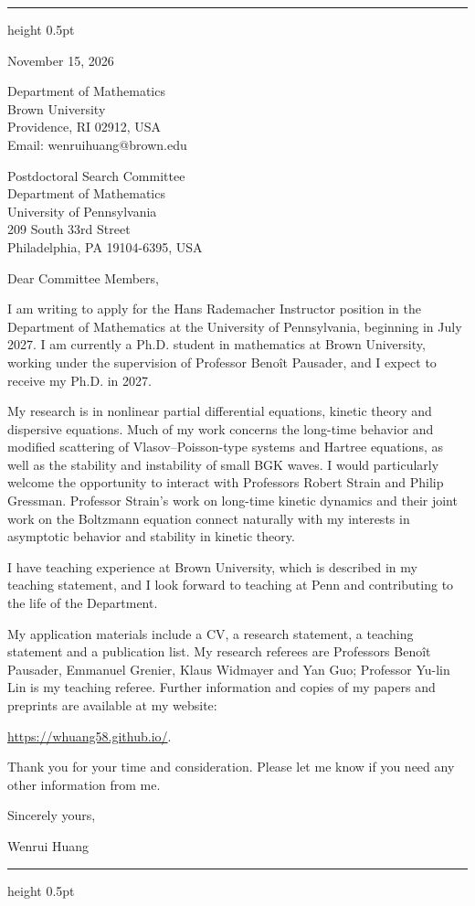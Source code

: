 \documentclass[10pt]{article}
\begin{document}
\vspace{0.08in}
\hrule height 0.5pt

\vspace{0.47in}
\hfill
\begin{minipage}{2.27in}
November 15, 2026

\vspace{0.16in}
Department of Mathematics\\
Brown University\\
Providence, RI 02912, USA\\
Email: wenrui\textunderscore huang@brown.edu
\end{minipage}

\vspace{0.30in}
Postdoctoral Search Committee\\
Department of Mathematics\\
University of Pennsylvania\\
209 South 33rd Street\\
Philadelphia, PA 19104-6395, USA

\vspace{0.16in}
Dear Committee Members,

I am writing to apply for the Hans Rademacher Instructor position in the Department of Mathematics at the University of Pennsylvania, beginning in July 2027. I am currently a Ph.D. student in mathematics at Brown University, working under the supervision of Professor Beno\^{i}t Pausader, and I expect to receive my Ph.D. in 2027.

My research is in nonlinear partial differential equations, kinetic theory and dispersive equations. Much of my work concerns the long-time behavior and modified scattering of Vlasov--Poisson-type systems and Hartree equations, as well as the stability and instability of small BGK waves. I would particularly welcome the opportunity to interact with Professors Robert Strain and Philip Gressman. Professor Strain's work on long-time kinetic dynamics and their joint work on the Boltzmann equation connect naturally with my interests in asymptotic behavior and stability in kinetic theory.

I have teaching experience at Brown University, which is described in my teaching statement, and I look forward to teaching at Penn and contributing to the life of the Department.

My application materials include a CV, a research statement, a teaching statement and a publication list. My research referees are Professors Beno\^{i}t Pausader, Emmanuel Grenier, Klaus Widmayer and Yan Guo; Professor Yu-lin Lin is my teaching referee. Further information and copies of my papers and preprints are available at my website:

\url{https://whuang58.github.io/}.

\medskip
Thank you for your time and consideration. Please let me know if you need any other information from me.

\vspace{0.12in}
Sincerely yours,

\vspace{0.12in}
Wenrui Huang

\vfill
\hrule height 0.5pt
\end{document}
